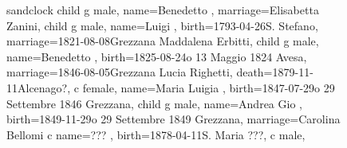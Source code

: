 \documentclass{article}
\begin{document}
\begin{figure}
\centering

    \begin{genealogypicture}[
        processing=database,
        database format=full,
        node size=3.5cm,
        level size=2.8cm,
        level distance=6mm,
        list separators hang=3mm,
        name font=\bfseries,
        surn code={\textcolor{black!50!black}{#1}},
        place text={\newline}{},
        date format=d month yyyy,
        tcbset={male/.style={colframe=blue,colback=blue!5},
        female/.style={colframe=red,colback=red!5}},
        box={fit basedim=7pt,boxsep=2pt,segmentation style=solid,
            halign=left,before upper=\parskip1pt,
            \gtrDBsex,
        },
    ]
    sandclock
    {
        child{
            g{
                male,
                name={Benedetto },
                marriage={Elisabetta Zanini}{},
            }
            child{
                g{
                    male,
                    name={Luigi },
                    birth={1793-04-26}{S. Stefano},
                    marriage={1821-08-08}{Grezzana \newline Maddalena Erbitti},
                }
                child{
                    g{
                        male,
                        name={Benedetto },
                        birth={1825-08-24}{o 13 Maggio 1824 \newline Avesa},
                        marriage={1846-08-05}{Grezzana \newline Lucia Righetti},
                        death={1879-11-11}{Alcenago?},
                    }
                    c{
                        female,
                        name={Maria Luigia },
                        birth={1847-07-29}{o 29 Settembre 1846 \newline Grezzana},
                    }
                    child{
                        g{
                            male,
                            name={Andrea Gio },
                            birth={1849-11-29}{o 29 Settembre 1849 \newline Grezzana},
                            marriage={Carolina Bellomi}{}
                        }
                        c{
                            name={??? },
                            birth={1878-04-11}{S. Maria ???},
                        }
                        c{
                            male,
}}}}}}
\end{genealogypicture}
\end{figure}
\end{document}
